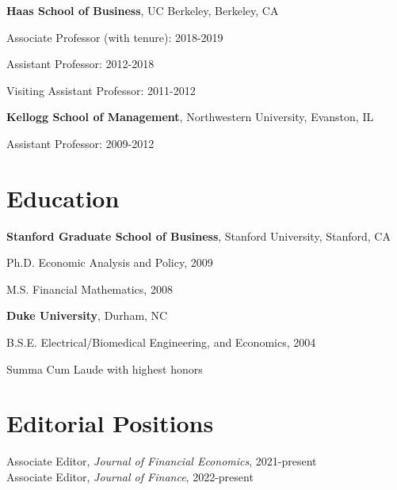 \documentclass[margin,line,11pt]{resume}
\begin{document}
\begin{resume}
    {\bf Haas School of Business}, UC Berkeley, Berkeley, CA  %
    \begin{list1}
    \item[] Associate Professor (with tenure): 2018-2019
    \item[] Assistant Professor: 2012-2018
    \item[] Visiting Assistant Professor: 2011-2012
    \end{list1}

    {\bf Kellogg School of Management}, Northwestern University,  Evanston, IL %
    \begin{list1}
    \item[] Assistant Professor: 2009-2012
    \end{list1}

    \section{\mysidestyle Education}

    {\bf Stanford Graduate School of Business}, Stanford University, Stanford, CA %
    \begin{list1}
       \item[] Ph.D. Economic Analysis and Policy, 2009
    \item[] M.S. Financial Mathematics, 2008
   \end{list1}


    {\bf Duke University}, Durham, NC %
    \begin{list1}
    \item[] B.S.E. Electrical/Biomedical Engineering, and Economics, 2004
    \item[] Summa Cum Laude with highest honors
  \end{list1}

\section{\mysidestyle Editorial Positions}


    Associate Editor, \emph{Journal of Financial Economics}, 2021-present \\
    Associate Editor, \emph{Journal of Finance}, 2022-present

\end{resume}
\end{document}

